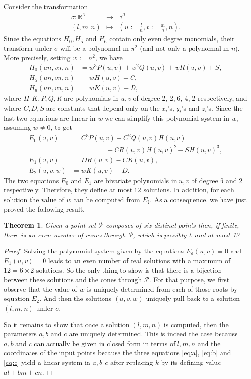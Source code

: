 \documentclass[5p]{elsarticle}
\newtheorem{thm}{Theorem}
\newcommand\RR{\mathbb R}
\newcommand\Pc{\mathcal P}
\newcommand{\com}[1]{{\color{black} #1}}
\newcommand{\lb}[1]{{\color{black} #1}}
\begin{document}
Consider the transformation
\begin{eqnarray*}
	\sigma : \RR^3 & \rightarrow & \RR^3 \\
	(l,m,n) & \mapsto & \left(u:=\frac{l}{n},v:=\frac{m}{n},n\right).
\end{eqnarray*}
Since the equations $H_0, H_5$ and $H_6$ \com{contain only} even degree monomials, their transform under $\sigma$ will be a polynomial in $n^2$ (and not only a polynomial in $n$). More precisely, setting $w:=n^2$, we have
\begin{align*}
	H_0(un,vn,n) & =  w^3P(u,v)+w^2Q(u,v)+wR(u,v)+S, \\
	H_5(un,vn,n) & =  wH(u,v)+C,\\ 
	H_6(un,vn,n) & =  wK(u,v)+D,
\end{align*}
where $H,K,P,Q,R$ are polynomials in $u,v$ of degree 2, 2, 6, 4, 2 respectively, and where $C,D,S$ are \com{constants} that \com{depend only} on the $x_i$'s, $y_i$'s and $z_i$'s. \com{Since} the \com{last two} equations are linear in $w$ we can simplify this polynomial system \com{in $w$}, assuming $w\neq 0$, to get 
\begin{align}\label{eq:cone6Psys}
	E_0(u,v) & =  C^3P(u,v)-C^2Q(u,v)H(u,v)\\ \nonumber
	 & \hspace{5em}+CR(u,v)H(u,v)^2-SH(u,v)^3, \\ \nonumber
	E_1(u,v) & =  DH(u,v)-CK(u,v),\\ \nonumber
	E_2(u,v,w) & =  wK(u,v)+D.
\end{align}
The two equations $E_0$ and $E_1$ are bivariate polynomials in $u,v$ of degree $6$ and $2$ respectively. Therefore, they define at most $12$ solutions. In addition, for each solution the value of $w$ can be computed from $E_2$. As a consequence, we have just proved the following result.

\begin{thm}\label{thm:12cones}
	 \com{Given} a point set $\Pc$ composed of six distinct points \com{then}, if finite, there is an even number of cones through $\Pc$, which is possibly 0 and at most 12.
\end{thm}
\begin{proof} \com{Solving} the polynomial system \com{given by the equations $E_0(u,v)=0$ and $E_1(u,v)=0$} leads to an even number of real solutions with a maximum of $12=6\times 2$ solutions. So the only thing to show is that there is a bijection between these solutions and the cones through $\Pc$. For that purpose, we first observe that the value of $w$ is uniquely determined from each of those roots by equation $E_2$. And then the solutions \com{$(u,v,w)$ uniquely \lb{pull back}} to a solution $(l,m,n)$ under $\sigma$. 
	
	\com{So} it remains to show that once a solution $(l,m,n)$ is computed, then the parameters $a,b$ and $c$ are uniquely determined. This is indeed the case because $a,b$ and $c$ can \com{actually be given} in closed form in terms of $l,m,n$ and the coordinates of the input \com{points because} the three equations \eqref{eq:a}, \eqref{eq:b} and \eqref{eq:c} \com{yield} a linear system in $a,b,c$ after replacing $k$ by its defining value $al+bm+cn$.
\end{proof}
\end{document}
